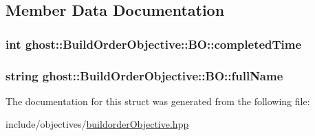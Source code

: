 \subsection{Member Data Documentation}
\hypertarget{structghost_1_1BuildOrderObjective_1_1BO_ac61b9122d2757d44ba08984665eda144}{
\subsubsection[{completed\-Time}]{\setlength{\rightskip}{0pt plus 5cm}int ghost\-::\-Build\-Order\-Objective\-::\-B\-O\-::completed\-Time}}\label{structghost_1_1BuildOrderObjective_1_1BO_ac61b9122d2757d44ba08984665eda144}
\hypertarget{structghost_1_1BuildOrderObjective_1_1BO_ae7a6f92b372f83aca41c2e71b338a88c}{
\subsubsection[{full\-Name}]{\setlength{\rightskip}{0pt plus 5cm}string ghost\-::\-Build\-Order\-Objective\-::\-B\-O\-::full\-Name}}\label{structghost_1_1BuildOrderObjective_1_1BO_ae7a6f92b372f83aca41c2e71b338a88c}


The documentation for this struct was generated from the following file\-:\begin{DoxyCompactItemize}
\item 
include/objectives/\hyperlink{buildorderObjective_8hpp}{buildorder\-Objective.\-hpp}\end{DoxyCompactItemize}
